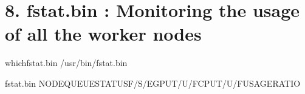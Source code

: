 \documentclass[a4paper,10pt,english]{sphinxmanual}
\begin{document}
\section{8. fstat.bin : Monitoring the usage of all the worker nodes}
\label{\detokenize{newfarm:fstat-bin-monitoring-the-usage-of-all-the-worker-nodes}}
\begin{sphinxVerbatim}[commandchars=\\\{\}]
\PYGZdl{}\PYGZgt{}whichfstat.bin
/usr/bin/fstat.bin

\PYGZdl{}\PYGZgt{}fstat.bin
\PYGZhy{}\PYGZhy{}\PYGZhy{}\PYGZhy{}\PYGZhy{}\PYGZhy{}\PYGZhy{}\PYGZhy{}\PYGZhy{}\PYGZhy{}\PYGZhy{}\PYGZhy{}\PYGZhy{}\PYGZhy{}\PYGZhy{}\PYGZhy{}\PYGZhy{}\PYGZhy{}\PYGZhy{}\PYGZhy{}\PYGZhy{}\PYGZhy{}\PYGZhy{}\PYGZhy{}\PYGZhy{}\PYGZhy{}\PYGZhy{}\PYGZhy{}\PYGZhy{}\PYGZhy{}\PYGZhy{}\PYGZhy{}\PYGZhy{}\PYGZhy{}\PYGZhy{}\PYGZhy{}\PYGZhy{}\PYGZhy{}\PYGZhy{}\PYGZhy{}\PYGZhy{}\PYGZhy{}\PYGZhy{}\PYGZhy{}\PYGZhy{}\PYGZhy{}\PYGZhy{}\PYGZhy{}\PYGZhy{}\PYGZhy{}\PYGZhy{}\PYGZhy{}\PYGZhy{}\PYGZhy{}\PYGZhy{}\PYGZhy{}\PYGZhy{}\PYGZhy{}\PYGZhy{}\PYGZhy{}\PYGZhy{}\PYGZhy{}\PYGZhy{}\PYGZhy{}\PYGZhy{}\PYGZhy{}\PYGZhy{}\PYGZhy{}\PYGZhy{}\PYGZhy{}\PYGZhy{}\PYGZhy{}\PYGZhy{}\PYGZhy{}\PYGZhy{}\PYGZhy{}\PYGZhy{}\PYGZhy{}\PYGZhy{}\PYGZhy{}\PYGZhy{}\PYGZhy{}\PYGZhy{}\PYGZhy{}\PYGZhy{}\PYGZhy{}\PYGZhy{}\PYGZhy{}\PYGZhy{}\PYGZhy{}\PYGZhy{}\PYGZhy{}\PYGZhy{}\PYGZhy{}\PYGZhy{}\PYGZhy{}\PYGZhy{}\PYGZhy{}\PYGZhy{}\PYGZhy{}\PYGZhy{}\PYGZhy{}\PYGZhy{}\PYGZhy{}\PYGZhy{}\PYGZhy{}\PYGZhy{}\PYGZhy{}\PYGZhy{}\PYGZhy{}\PYGZhy{}\PYGZhy{}\PYGZhy{}\PYGZhy{}\PYGZhy{}\PYGZhy{}\PYGZhy{}\PYGZhy{}\PYGZhy{}\PYGZhy{}
NODEQUEUESTATUSF/S/E\PYG{o}{[}GPU\PYG{o}{]}T/U/F\PYG{o}{[}CPU\PYG{o}{]}T/U/FUSAGERATIO
\PYGZhy{}\PYGZhy{}\PYGZhy{}\PYGZhy{}\PYGZhy{}\PYGZhy{}\PYGZhy{}\PYGZhy{}\PYGZhy{}\PYGZhy{}\PYGZhy{}\PYGZhy{}\PYGZhy{}\PYGZhy{}\PYGZhy{}\PYGZhy{}\PYGZhy{}\PYGZhy{}\PYGZhy{}\PYGZhy{}\PYGZhy{}\PYGZhy{}\PYGZhy{}\PYGZhy{}\PYGZhy{}\PYGZhy{}\PYGZhy{}\PYGZhy{}\PYGZhy{}\PYGZhy{}\PYGZhy{}\PYGZhy{}\PYGZhy{}\PYGZhy{}\PYGZhy{}\PYGZhy{}\PYGZhy{}\PYGZhy{}\PYGZhy{}\PYGZhy{}\PYGZhy{}\PYGZhy{}\PYGZhy{}\PYGZhy{}\PYGZhy{}\PYGZhy{}\PYGZhy{}\PYGZhy{}\PYGZhy{}\PYGZhy{}\PYGZhy{}\PYGZhy{}\PYGZhy{}\PYGZhy{}\PYGZhy{}\PYGZhy{}\PYGZhy{}\PYGZhy{}\PYGZhy{}\PYGZhy{}\PYGZhy{}\PYGZhy{}\PYGZhy{}\PYGZhy{}\PYGZhy{}\PYGZhy{}\PYGZhy{}\PYGZhy{}\PYGZhy{}\PYGZhy{}\PYGZhy{}\PYGZhy{}\PYGZhy{}\PYGZhy{}\PYGZhy{}\PYGZhy{}\PYGZhy{}\PYGZhy{}\PYGZhy{}\PYGZhy{}\PYGZhy{}\PYGZhy{}\PYGZhy{}\PYGZhy{}\PYGZhy{}\PYGZhy{}\PYGZhy{}\PYGZhy{}\PYGZhy{}\PYGZhy{}\PYGZhy{}\PYGZhy{}\PYGZhy{}\PYGZhy{}\PYGZhy{}\PYGZhy{}\PYGZhy{}\PYGZhy{}\PYGZhy{}\PYGZhy{}\PYGZhy{}\PYGZhy{}\PYGZhy{}\PYGZhy{}\PYGZhy{}\PYGZhy{}\PYGZhy{}\PYGZhy{}\PYGZhy{}\PYGZhy{}\PYGZhy{}\PYGZhy{}\PYGZhy{}\PYGZhy{}\PYGZhy{}\PYGZhy{}\PYGZhy{}\PYGZhy{}\PYGZhy{}\PYGZhy{}

\end{sphinxVerbatim}
\end{document}
